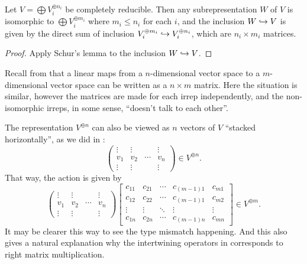 \begin{corollary}
	\label{cor:subrep_schur}
	Let $V = \bigoplus V_i^{\oplus n_i}$ be completely reducible.
	Then any subrepresentation $W$ of $V$ is isomorphic
	to $\bigoplus V_i^{\oplus m_i}$ where $m_i \le n_i$ for each $i$,
	and the inclusion $W \hookrightarrow V$ is given
	by the direct sum of inclusion $V_i^{\oplus m_i} \hookrightarrow V_i^{\oplus n_i}$,
	which are $n_i \times m_i$ matrices.
\end{corollary}
\begin{proof}
	Apply Schur's lemma to the inclusion $W \hookrightarrow V$.
\end{proof}
Recall from  that a linear maps from a
$n$-dimensional vector space to a $m$-dimensional vector space can be written as
a $n \times m$ matrix. Here the situation is similar, however the matrices are
made for each irrep independently, and the non-isomorphic irreps, in some sense,
``doesn't talk to each other''.


\begin{remark}
	The representation $V^{\oplus n}$ can also be viewed as $n$
	vectors of $V$ ``stacked horizontally'', as we did in
	:
	\[
		\begin{pmatrix}
			\vdots & \vdots & & \vdots \\
			v_1 & v_2 & \cdots & v_n \\
			\vdots & \vdots & & \vdots
		\end{pmatrix} \in V^{\oplus n}.
	\]
	That way, the action is given by
	\[
		\begin{pmatrix}
			\vdots & \vdots & & \vdots \\
			v_1 & v_2 & \cdots & v_n \\
			\vdots & \vdots & & \vdots
		\end{pmatrix}
		\begin{bmatrix}
			c_{11} & c_{21} & \cdots & c_{(m-1)1} & c_{m1} \\
			c_{12} & c_{22} & \cdots & c_{(m-1)1} & c_{m2} \\
			\vdots & \vdots & \ddots & \vdots & \vdots \\
			c_{1n} & c_{2n} & \cdots & c_{(m-1)n} & c_{mn}
		\end{bmatrix}
		\in V^{\oplus m}.
	\]
	It may be clearer this way to see the type mismatch happening.
	And this also gives a natural explanation why the intertwining operators in
	 corresponds to right matrix multiplication.
\end{remark}


